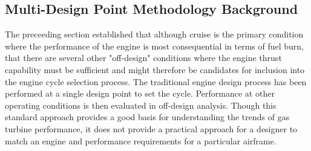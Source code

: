 	\subsection{Multi-Design Point Methodology Background}		
		\indent The preceeding section established that although cruise is the primary condition where the performance of the engine is most consequential in terms of fuel burn, that there are several other "off-design" conditions where the engine thrust capability must be sufficient and might therefore be candidates for inclusion into the engine cycle selection process.  The traditional engine design process has been performed at a single design point to set the cycle.  Performance at other operating conditions is then evaluated in off-design analysis.  Though this standard approach provides a good basis for understanding the trends of gas turbine performance, it does not provide a practical approach for a designer to match an engine and performance requirements for a particular airframe.  
		
